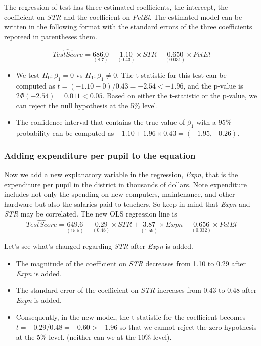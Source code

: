 \documentclass[a4paper,11pt]{article}
\begin{document}
The regression of test has three estimated coefficients, the
intercept, the coefficient on \emph{STR} and the coefficient on
\emph{PctEl}. The estimated model can be written in the following format
with the standard errors of the three coefficients reporeed in
parentheses them.

\begin{equation*}
\widehat{TestScore} = \underset{{\displaystyle (8.7)}}{686.0}
- \underset{{\displaystyle (0.43)}}{1.10} \times STR
- \underset{\displaystyle (0.031)}{0.650} \times PctEl
\end{equation*}

\begin{itemize}
\item We test \(H_0: \beta_1 = 0\) vs \(H_1: \beta_1 \neq 0\). The t-statistic
for this test can be computed as \(t = (-1.10-0) / 0.43 = -2.54 <
  -1.96\), and the p-value is \(2\Phi(-2.54) = 0.011 < 0.05\). Based on
either the t-statistic or the p-value, we can reject the null
hypothesis at the 5\% level.

\item The confidence interval that contains the
true value of \(\beta_1\) with a 95\% probability can be computed as
\(-1.10 \pm 1.96 \times 0.43 = (-1.95, -0.26)\).
\end{itemize}

\subsubsection*{Adding expenditure per pupil to the equation}
\label{sec:org2cd3a2a}

Now we add a new explanatory variable in the regression, \emph{Expn}, that
is the expenditure per pupil in the district in thousands of dollars.
Note expenditure includes not only the spending on new computers,
maintenance, and other hardware but also the salaries paid to
teachers. So keep in mind that \emph{Expn} and \emph{STR} may be
correlated. The new OLS regression line is
\begin{equation*}
\widehat{TestScore} = \underset{{\displaystyle (15.5)}}{649.6}
- \underset{\displaystyle (0.48)}{0.29} \times STR
+ \underset{\displaystyle (1.59)}{3.87} \times Expn
- \underset{\displaystyle (0.032)}{0.656} \times PctEl
\end{equation*}


Let's see what's changed regarding \emph{STR} after \emph{Expn} is added.
\begin{itemize}
\item The magnitude of the coefficient on \emph{STR} decreases from 1.10 to
0.29 after \emph{Expn} is added.
\item The standard error of the coefficient on \emph{STR} increases from 0.43
to 0.48 after \emph{Expn} is added.
\item Consequently, in the new model, the t-statistic for the coefficient
becomes \(t = -0.29/0.48 = -0.60 > -1.96\) so that we cannot reject
the zero hypothesis at the 5\% level. (neither can we at the 10\%
level).
\end{itemize}
\end{document}
